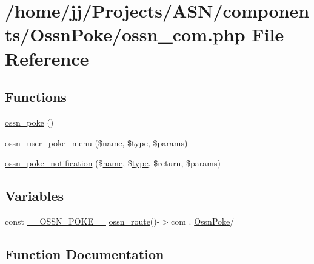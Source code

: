 \hypertarget{_ossn_poke_2ossn__com_8php}{}\section{/home/jj/\+Projects/\+A\+S\+N/components/\+Ossn\+Poke/ossn\+\_\+com.php File Reference}
\label{_ossn_poke_2ossn__com_8php}
\subsection*{Functions}
\begin{DoxyCompactItemize}
\item 
\hyperlink{_ossn_poke_2ossn__com_8php_aebbc09e72880f176cd49c2679406a533}{ossn\+\_\+poke} ()
\item 
\hyperlink{_ossn_poke_2ossn__com_8php_ab59dd8fe206cd7d9513e527e65e5c59d}{ossn\+\_\+user\+\_\+poke\+\_\+menu} (\$\hyperlink{user_8php_a765af5e9671743530143a6d3670fd9a6}{name}, \$\hyperlink{_ossn_wall_2actions_2wall_2post_2group_8php_a2dc1bb4e1ed0029daa81ac0776b14b51}{type}, \$params)
\item 
\hyperlink{_ossn_poke_2ossn__com_8php_a7bdd2f7afe499153b30a7e8847ad8e68}{ossn\+\_\+poke\+\_\+notification} (\$\hyperlink{user_8php_a765af5e9671743530143a6d3670fd9a6}{name}, \$\hyperlink{_ossn_wall_2actions_2wall_2post_2group_8php_a2dc1bb4e1ed0029daa81ac0776b14b51}{type}, \$return, \$params)
\end{DoxyCompactItemize}
\subsection*{Variables}
\begin{DoxyCompactItemize}
\item 
const \hyperlink{_ossn_poke_2ossn__com_8php_af171da8516373131e1c319d6801b48fd}{\+\_\+\+\_\+\+O\+S\+S\+N\+\_\+\+P\+O\+K\+E\+\_\+\+\_\+} \hyperlink{ossn_8lib_8route_8php_ac23dc424aa33dcd57982b72f4ed1217e}{ossn\+\_\+route}()-\/$>$com . \textquotesingle{}\hyperlink{class_ossn_poke}{Ossn\+Poke}/\textquotesingle{}
\end{DoxyCompactItemize}


\subsection{Function Documentation}
